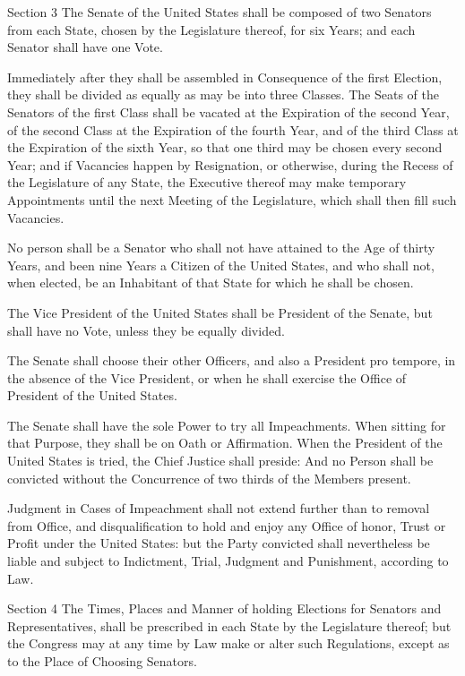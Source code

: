 \documentclass{article}
\begin{document}
Section 3
The Senate of the United States shall be composed of two Senators from each
State, chosen by the Legislature thereof, for six Years; and each Senator shall
have one Vote.

Immediately after they shall be assembled in Consequence of the first Election,
they shall be divided as equally as may be into three Classes. The Seats of the
Senators of the first Class shall be vacated at the Expiration of the second
Year, of the second Class at the Expiration of the fourth Year, and of the
third Class at the Expiration of the sixth Year, so that one third may be
chosen every second Year; and if Vacancies happen by Resignation, or otherwise,
during the Recess of the Legislature of any State, the Executive thereof may
make temporary Appointments until the next Meeting of the Legislature, which
shall then fill such Vacancies.

No person shall be a Senator who shall not have attained to the Age of thirty
Years, and been nine Years a Citizen of the United States, and who shall not,
when elected, be an Inhabitant of that State for which he shall be chosen.

The Vice President of the United States shall be President of the Senate, but
shall have no Vote, unless they be equally divided.

The Senate shall choose their other Officers, and also a President pro tempore,
in the absence of the Vice President, or when he shall exercise the Office of
President of the United States.

The Senate shall have the sole Power to try all Impeachments. When sitting for
that Purpose, they shall be on Oath or Affirmation. When the President of the
United States is tried, the Chief Justice shall preside: And no Person shall be
convicted without the Concurrence of two thirds of the Members present.

Judgment in Cases of Impeachment shall not extend further than to removal from
Office, and disqualification to hold and enjoy any Office of honor, Trust or
Profit under the United States: but the Party convicted shall nevertheless be
liable and subject to Indictment, Trial, Judgment and Punishment, according to
Law.

Section 4
The Times, Places and Manner of holding Elections for Senators and
Representatives, shall be prescribed in each State by the Legislature thereof;
but the Congress may at any time by Law make or alter such Regulations, except
as to the Place of Choosing Senators.
\end{document}
